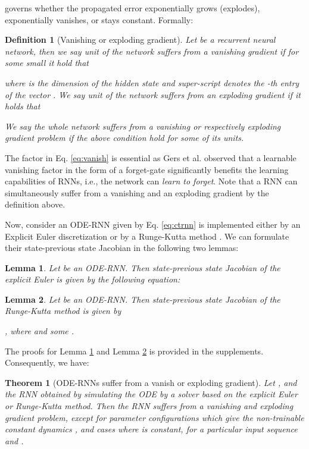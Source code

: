 \documentclass{article}
\newtheorem{theorem}{Theorem}
\newtheorem{lemma}{Lemma}
\newtheorem{definition}{Definition}
\begin{document}
governs whether the propagated error exponentially grows (explodes), exponentially vanishes, or stays constant. Formally:





\begin{definition}[Vanishing or exploding gradient]
    Let  be a recurrent neural network, then we say unit  of the network  suffers from a vanishing gradient if for some small  it hold that
    
    where  is the dimension of the hidden state  and super-script  denotes the -th entry of the vector .
    We say unit  of the network  suffers from an exploding gradient if it holds that
    
    We say the whole network  suffers from a vanishing or respectively exploding gradient problem if the above condition hold for some of its units.
\end{definition}


The factor  in Eq. \ref{eq:vanish} is essential as Gers et al. \cite{gers1999learning} observed that a learnable vanishing factor in the form of a forget-gate significantly benefits the learning capabilities of RNNs, i.e., the network can \emph{learn to forget}.
Note that a RNN can simultaneously suffer from a vanishing and an exploding gradient by the definition above. 

Now, consider an ODE-RNN given by Eq. \ref{eq:ctrnn} is implemented either by an Explicit Euler discretization or by a Runge-Kutta method \cite{runge1895numerische,dormand1980family}.  We can formulate their state-previous state Jacobian in the following two lemmas:

\begin{lemma}
\label{lem:1}
    Let  be an ODE-RNN. Then state-previous state Jacobian of the explicit Euler is given by the following equation:
    
\end{lemma}
\begin{lemma}
\label{lem:2}
    Let  be an ODE-RNN. Then state-previous state Jacobian of the Runge-Kutta method is given by
    
    , where  and some .
\end{lemma}

The proofs for Lemma \ref{lem:1} and Lemma \ref{lem:2} is provided in the supplements. Consequently, we have:

\begin{theorem}[ODE-RNNs suffer from a vanish or exploding gradient]\label{thm:odevanish}
    Let , and  the RNN obtained by simulating the ODE by a solver based on the explicit Euler or Runge-Kutta method.
    Then the RNN suffers from a vanishing and exploding gradient problem, except for parameter configurations which give the non-trainable constant dynamics , and cases where  is constant, for a particular input sequence  and .
\end{theorem}
\end{document}

